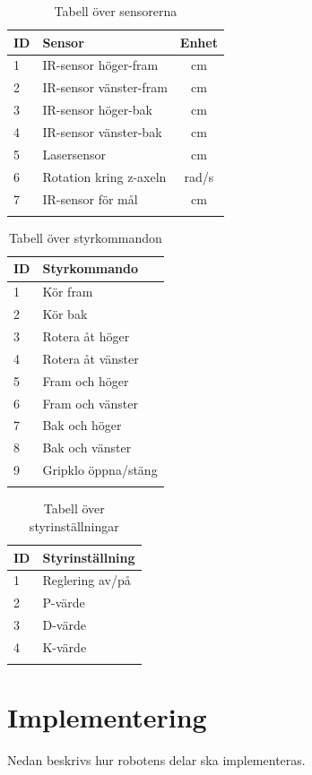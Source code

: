\documentclass[11pt]{article}
\begin{document}
\begin{flushleft}
\begin{longtable}[l]{| l | l | c |} \hline
\textbf{ID} & \textbf{Sensor} & \textbf{Enhet} \\ \hline 
1 & IR-sensor höger-fram & cm \\ \hline
2 & IR-sensor vänster-fram  & cm \\ \hline
3 & IR-sensor höger-bak  & cm  \\ \hline
4 & IR-sensor vänster-bak  &  cm \\ \hline
5 & Lasersensor & cm  \\ \hline
6 & Rotation kring z-axeln & rad/s \\ \hline
7 & IR-sensor för mål & cm \\ \hline
\caption{Tabell över sensorerna}\label{sensortab}
\end{longtable}

\begin{longtable}[l]{| l | l |} \hline
\textbf{ID} & \textbf{Styrkommando} \\ \hline 
1 & Kör fram \\ \hline
2 & Kör bak \\ \hline
3 & Rotera åt höger \\ \hline
4 & Rotera åt vänster \\ \hline
5 & Fram och höger \\ \hline
6 & Fram och vänster \\ \hline
7 & Bak och höger \\ \hline
8 & Bak och vänster \\ \hline
9 & Gripklo öppna/stäng \\ \hline

\caption{Tabell över styrkommandon}\label{styrtab}
\end{longtable}

\begin{longtable}[l]{| l | l |} \hline
\textbf{ID} & \textbf{Styrinställning} \\ \hline 
1 & Reglering av/på \\ \hline
2 & P-värde \\ \hline
3 & D-värde \\ \hline
4 & K-värde \\ \hline

\caption{Tabell över styrinställningar}\label{styrinsttab}
\end{longtable}

\pagebreak
\section{Implementering}
Nedan beskrivs hur robotens delar ska implementeras. 



\end{flushleft}
\end{document}

